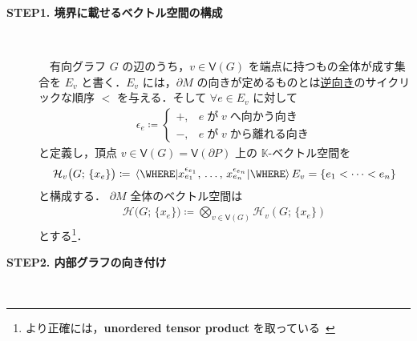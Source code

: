 \documentclass[TQFT_main]{subfiles}
\begin{document}
\begin{description}
    \item[\textbf{STEP1. 境界に載せるベクトル空間の構成}]　
    
    　有向グラフ $G$ の辺のうち，$v \in \mathsf{V}(G)$ を端点に持つもの全体が成す集合を $E_v$ と書く．$E_v$ には，$\partial M$ の向きが定めるものとは\underline{逆向き}のサイクリックな順序 $<$ を与える．そして $\forall e \in E_v$ に対して
    \begin{align}
        \epsilon_e \coloneqq
        \begin{cases}
            +, &e\;\text{が}\; v\; \text{へ向かう向き} \\
            -, &e\;\text{が}\; v\; \text{から離れる向き}
        \end{cases}
    \end{align}
    と定義し，頂点 $v \in \mathsf{V}(G) = \mathsf{V}(\partial P)$ 上の $\mathbb{K}$-ベクトル空間を
    \begin{align}
        \mathcal{H}_v\bigl(G;\, \{x_e\}\bigr) \coloneqq \expval{x_{e_1}^{\epsilon_{e_1}},\, \dots,\, x_{e_n}^{\epsilon_{e_n}}} \WHERE E_v = \{e_1 < \cdots < e_n\}
    \end{align}
    と構成する．
    $\partial M$ 全体のベクトル空間は
    \begin{align}
        \mathcal{H}\bigl(G;\, \{x_e\}\bigr) \coloneqq \bigotimes_{v \in \mathsf{V}(G)} \mathcal{H}_v(G;\, \{x_e\})
    \end{align}
    とする\footnote{より正確には，\textbf{unordered tensor product} を取っている~\cite[Appendix E, p.477]{Turaev2017}}．

    \item[\textbf{STEP2. 内部グラフの向き付け}]　
    

\end{description}
\end{document}
